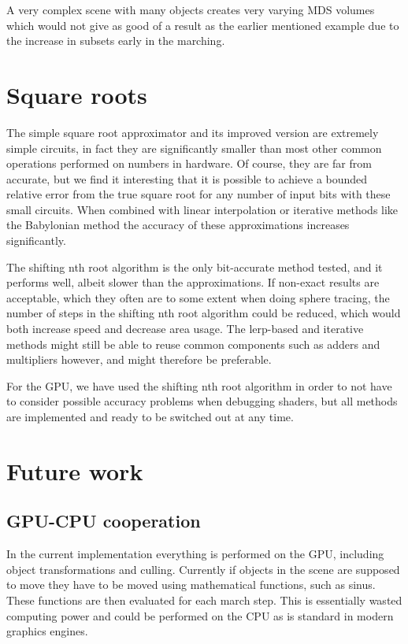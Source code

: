 			A very complex scene with many objects creates very varying MDS
			volumes which would not give as good of a result as the earlier
			mentioned example due to the increase in subsets early in the
			marching.

	\section{Square roots}

		The simple square root approximator and its improved version are
		extremely simple circuits, in fact they are significantly smaller than
		most other common operations performed on numbers in hardware. Of
		course, they are far from accurate, but we find it interesting that it
		is possible to achieve a bounded relative error from the true square
		root for any number of input bits with these small circuits. When
		combined with linear interpolation or iterative methods like the
		Babylonian method the accuracy of these approximations increases
		significantly.
		
		The shifting nth root algorithm is the only bit-accurate method tested,
		and it performs well, albeit slower than the approximations. If
		non-exact results are acceptable, which they often are to some extent
		when doing sphere tracing, the number of steps in the shifting nth root
		algorithm could be reduced, which would both increase speed and
		decrease area usage. The lerp-based and iterative methods might still
		be able to reuse common components such as adders and multipliers
		however, and might therefore be preferable.
		
		For the GPU, we have used the shifting nth root algorithm in order
		to not have to consider possible accuracy problems when debugging
		shaders, but all methods are implemented and ready to be switched out
		at any time.
		

	\section{Future work} \label{futureoptimizations} 

		\subsection{GPU-CPU cooperation}

			In the current implementation everything is performed on the GPU,
			including object transformations and culling. Currently if objects
			in the scene are supposed to move they have to be moved using
			mathematical functions, such as sinus. These functions are then
			evaluated for each march step. This is essentially wasted computing
			power and could be performed on the CPU as is standard in modern
			graphics engines.

